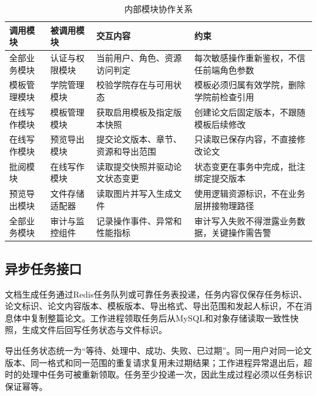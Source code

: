 \documentclass{../template/softeng}
\begin{document}
	\begin{table}[htbp]
		\centering
		\small
		\caption{内部模块协作关系}
		\begin{tabular}{p{2.5cm}p{3.0cm}p{3.0cm}p{3.8cm}}
			\toprule
			调用模块 & 被调用模块 & 交互内容 & 约束 \\
			\midrule
			全部业务模块 & 认证与权限模块 & 当前用户、角色、资源访问判定 & 每次敏感操作重新鉴权，不信任前端角色参数 \\
			模板管理模块 & 学院管理模块 & 校验学院存在与可用状态 & 模板必须归属有效学院，删除学院前检查引用 \\
			在线写作模块 & 模板管理模块 & 获取启用模板及指定版本快照 & 创建论文后固定版本，不跟随模板后续修改 \\
			在线写作模块 & 预览导出模块 & 提交论文版本、章节、资源和导出范围 & 只读取已保存内容，不直接修改论文 \\
			批阅模块 & 在线写作模块 & 读取提交快照并驱动论文状态变更 & 状态变更在事务中完成，批注绑定提交版本 \\
			预览导出模块 & 文件存储适配器 & 读取图片并写入生成文件 & 使用逻辑资源标识，不在业务层拼接物理路径 \\
			全部业务模块 & 审计与监控组件 & 记录操作事件、异常和性能指标 & 审计写入失败不得泄露业务数据，关键操作需告警 \\
			\bottomrule
		\end{tabular}
	\end{table}
	
	\subsection{异步任务接口}
	文档生成任务通过Redis任务队列或可靠任务表投递，任务内容仅保存任务标识、论文标识、论文内容版本、模板版本、导出格式、导出范围和发起人标识，不在消息体中复制整篇论文。工作进程领取任务后从MySQL和对象存储读取一致性快照，生成文件后回写任务状态与文件标识。
	
	导出任务状态统一为“等待、处理中、成功、失败、已过期”。同一用户对同一论文版本、同一格式和同一范围的重复请求复用未过期结果；工作进程异常退出后，超时的处理中任务可被重新领取。任务至少投递一次，因此生成过程必须以任务标识保证幂等。
	
\end{document}
